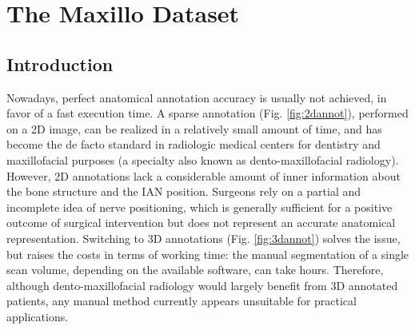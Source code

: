 
\chapter{The Maxillo Dataset}

\label{chp:maxillo}

\def\:{\hskip0pt} %

\section{Introduction}
Nowadays, perfect anatomical annotation accuracy is usually not achieved, in
favor of a fast execution time. A sparse annotation (Fig. \ref{fig:2dannot}),
performed on a 2D image, can be realized in a relatively small amount of time,
and has become the de facto standard in radiologic medical centers for dentistry
and maxillofacial purposes (a specialty also known as dento-maxillofacial
radiology). However, 2D annotations lack a considerable amount of inner
information about the bone structure and the IAN position. Surgeons rely on a
partial and incomplete idea of nerve positioning, which is generally sufficient
for a positive outcome of surgical intervention but does not represent an
accurate anatomical representation. Switching to 3D annotations (Fig.
\ref{fig:3dannot}) solves the issue, but raises the costs in terms of working
time: the manual segmentation of a single scan volume, depending on the
available software, can take hours. Therefore, although dento-maxillofacial
radiology would largely benefit from 3D annotated patients, any manual method
currently appears unsuitable for practical applications.

